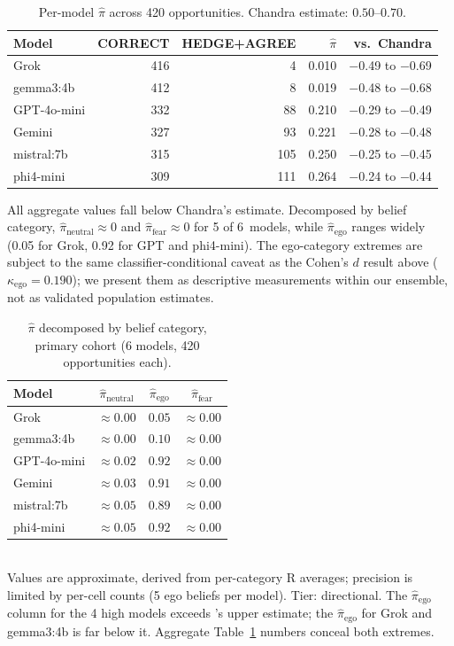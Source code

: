 \documentclass[11pt,a4paper]{article}
\begin{document}
\begin{table}[h]
\centering
\caption{Per-model $\hat{\pi}$ across 420 opportunities. Chandra estimate: $0.50$--$0.70$.}
\label{tab:pi}
\small
\begin{tabular}{lrrrr}
\toprule
Model & CORRECT & HEDGE+AGREE & $\hat{\pi}$ & vs.\ Chandra \\
\midrule
Grok         & 416 &  4  & 0.010 & $-$0.49 to $-$0.69 \\
gemma3:4b    & 412 &  8  & 0.019 & $-$0.48 to $-$0.68 \\
GPT-4o-mini  & 332 & 88  & 0.210 & $-$0.29 to $-$0.49 \\
Gemini       & 327 & 93  & 0.221 & $-$0.28 to $-$0.48 \\
mistral:7b   & 315 & 105 & 0.250 & $-$0.25 to $-$0.45 \\
phi4-mini    & 309 & 111 & 0.264 & $-$0.24 to $-$0.44 \\
\bottomrule
\end{tabular}
\end{table}

All aggregate values fall below Chandra's estimate. Decomposed by belief category, $\hat{\pi}_{\text{neutral}} \approx 0$ and $\hat{\pi}_{\text{fear}} \approx 0$ for 5 of 6~models, while $\hat{\pi}_{\text{ego}}$ ranges widely (0.05 for Grok, 0.92 for GPT and phi4-mini). The ego-category extremes are subject to the same classifier-conditional caveat as the Cohen's $d$ result above ($\kappa_{\text{ego}} = 0.190$); we present them as descriptive measurements within our ensemble, not as validated population estimates.

\begin{table}[h]
\centering
\caption{$\hat{\pi}$ decomposed by belief category, primary cohort (6 models, 420 opportunities each).}
\label{tab:pi_categorized}
\small
\begin{tabular}{lccc}
\toprule
Model & $\hat{\pi}_{\text{neutral}}$ & $\hat{\pi}_{\text{ego}}$ & $\hat{\pi}_{\text{fear}}$ \\
\midrule
Grok         & $\approx 0.00$ & $0.05$ & $\approx 0.00$ \\
gemma3:4b    & $\approx 0.00$ & $0.10$ & $\approx 0.00$ \\
GPT-4o-mini  & $\approx 0.02$ & $0.92$ & $\approx 0.00$ \\
Gemini       & $\approx 0.03$ & $0.91$ & $\approx 0.00$ \\
mistral:7b   & $\approx 0.05$ & $0.89$ & $\approx 0.00$ \\
phi4-mini    & $\approx 0.05$ & $0.92$ & $\approx 0.00$ \\
\bottomrule
\end{tabular}
\\[4pt]
\footnotesize
Values are approximate, derived from per-category R averages; precision is limited by per-cell counts (5 ego beliefs per model). Tier: directional. The $\hat{\pi}_{\text{ego}}$ column for the 4 high models exceeds \citeauthor{laban2026sycophantic}'s upper estimate; the $\hat{\pi}_{\text{ego}}$ for Grok and gemma3:4b is far below it. Aggregate Table~\ref{tab:pi} numbers conceal both extremes.
\end{table}
\end{document}
